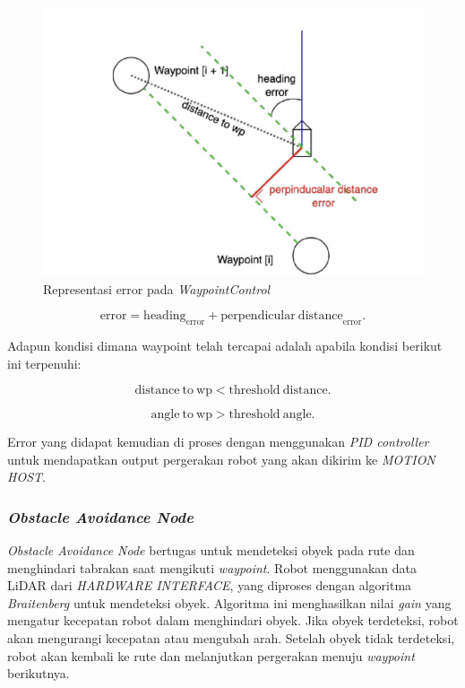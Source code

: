 \begin{figure}[H] \centering
  \includegraphics[scale=0.8]{gambar/waypoint_control.png}
  \caption{Representasi error pada \emph{WaypointControl}}
  \label{fig:error_waypointcontrol}
\end{figure}

\begin{equation}
  \label{eq:error}
  \mathrm{error} = \mathrm{heading}_{\mathrm{error}} + \mathrm{perpendicular\ distance}_{\mathrm{error}}.
\end{equation}

Adapun kondisi dimana waypoint telah tercapai adalah apabila kondisi berikut ini terpenuhi:

\begin{equation}
  \label{eq:condition_distance}
  \mathrm{distance\ to\ wp} < \mathrm{threshold\ distance}.
\end{equation}

\begin{equation}
  \label{eq:condition_angle}
  \mathrm{angle\ to\ wp} > \mathrm{threshold\ angle}.
\end{equation}

Error yang didapat kemudian di proses dengan menggunakan \emph{PID controller} untuk mendapatkan output pergerakan robot yang akan dikirim ke \emph{MOTION HOST}.

\subsubsection{\emph{Obstacle Avoidance Node}}
\emph{Obstacle Avoidance Node} bertugas untuk mendeteksi obyek pada rute dan menghindari tabrakan saat mengikuti \emph{waypoint}. Robot menggunakan data LiDAR dari \emph{HARDWARE INTERFACE}, yang diproses dengan algoritma \emph{Braitenberg} untuk mendeteksi obyek. Algoritma ini menghasilkan nilai \emph{gain} yang mengatur kecepatan robot dalam menghindari obyek. Jika obyek terdeteksi, robot akan mengurangi kecepatan atau mengubah arah. Setelah obyek tidak terdeteksi, robot akan kembali ke rute dan melanjutkan pergerakan menuju \emph{waypoint} berikutnya.

